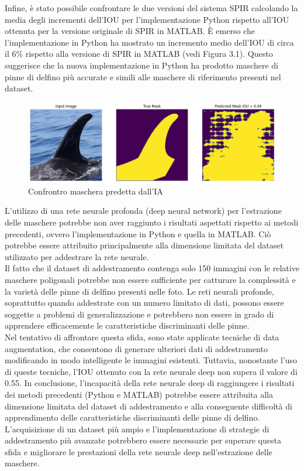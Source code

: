 \documentclass[a4paper,12pt]{report}
\begin{document}
    Infine, è stato possibile confrontare le due versioni del sistema SPIR calcolando la media degli incrementi dell'IOU per l'implementazione Python rispetto all'IOU ottenuta per la versione originale di SPIR in MATLAB.
    È emerso che l'implementazione in Python ha mostrato un incremento medio dell'IOU di circa il 6\% rispetto alla versione di SPIR in MATLAB (vedi Figura 3.1).
    Questo suggerisce che la nuova implementazione in Python ha prodotto maschere di pinne di delfino più accurate e simili alle maschere di riferimento presenti nel dataset.

    \begin{figure}[H]
      \centering
      \includegraphics[width=\textwidth]{assets/images/results/result_mask_deep.png}   
      \caption{Confrontro maschera predetta dall'IA}
    \end{figure}
    L'utilizzo di una rete neurale profonda (deep neural network) per l'estrazione delle maschere potrebbe non aver raggiunto i risultati aspettati rispetto ai metodi precedenti, ovvero l'implementazione in Python e quella in MATLAB. Ciò potrebbe essere attribuito principalmente alla dimensione limitata del dataset utilizzato per addestrare la rete neurale.
    \\
    Il fatto che il dataset di addestramento contenga solo 150 immagini con le relative maschere poligonali potrebbe non essere sufficiente per catturare la complessità e la varietà delle pinne di delfino presenti nelle foto. Le reti neurali profonde, soprattutto quando addestrate con un numero limitato di dati, possono essere soggette a problemi di generalizzazione e potrebbero non essere in grado di apprendere efficacemente le caratteristiche discriminanti delle pinne.
    \\
    Nel tentativo di affrontare questa sfida, sono state applicate tecniche di data augmentation, che consentono di generare ulteriori dati di addestramento modificando in modo intelligente le immagini esistenti. Tuttavia, nonostante l'uso di queste tecniche, l'IOU ottenuto con la rete neurale deep non supera il valore di 0.55.
    In conclusione, l'incapacità della rete neurale deep di raggiungere i risultati dei metodi precedenti (Python e MATLAB) potrebbe essere attribuita alla dimensione limitata del dataset di addestramento e alla conseguente difficoltà di apprendimento delle caratteristiche discriminanti delle pinne di delfino. L'acquisizione di un dataset più ampio e l'implementazione di strategie di addestramento più avanzate potrebbero essere necessarie per superare questa sfida e migliorare le prestazioni della rete neurale deep nell'estrazione delle maschere.
\end{document}
